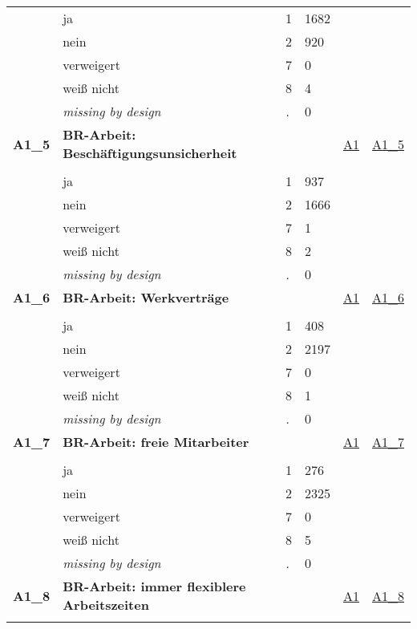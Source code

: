 \begin{longtable}{| L{2.45cm} | L{6cm} | C{1.5cm} | R{1cm} | C{2.25cm} | C{2.25cm} |}
   & ja & 1 & 1682 &  &  \\ 
   & nein & 2 & 920 &  &  \\ 
   & verweigert & 7 & 0 &  &  \\ 
   & weiß nicht & 8 & 4 &  &  \\ 
   & \textit{missing by design} & \textit{.} & 0 &  &  \\ 
   \midrule
\textbf{A1\_5}\label{var:A1:5} & \textbf{BR-Arbeit: Beschäftigungsunsicherheit} &  &  & \hyperref[A1]{A1} & \hyperref[var:suf:A1:5]{A1\_5} \\ 
   &  &  &  &  &  \\ 
   & ja & 1 & 937 &  &  \\ 
   & nein & 2 & 1666 &  &  \\ 
   & verweigert & 7 & 1 &  &  \\ 
   & weiß nicht & 8 & 2 &  &  \\ 
   & \textit{missing by design} & \textit{.} & 0 &  &  \\ 
   \midrule
\textbf{A1\_6}\label{var:A1:6} & \textbf{BR-Arbeit: Werkverträge} &  &  & \hyperref[A1]{A1} & \hyperref[var:suf:A1:6]{A1\_6} \\ 
   &  &  &  &  &  \\ 
   & ja & 1 & 408 &  &  \\ 
   & nein & 2 & 2197 &  &  \\ 
   & verweigert & 7 & 0 &  &  \\ 
   & weiß nicht & 8 & 1 &  &  \\ 
   & \textit{missing by design} & \textit{.} & 0 &  &  \\ 
   \midrule
\textbf{A1\_7}\label{var:A1:7} & \textbf{BR-Arbeit: freie Mitarbeiter} &  &  & \hyperref[A1]{A1} & \hyperref[var:suf:A1:7]{A1\_7} \\ 
   &  &  &  &  &  \\ 
   & ja & 1 & 276 &  &  \\ 
   & nein & 2 & 2325 &  &  \\ 
   & verweigert & 7 & 0 &  &  \\ 
   & weiß nicht & 8 & 5 &  &  \\ 
   & \textit{missing by design} & \textit{.} & 0 &  &  \\ 
   \midrule
\textbf{A1\_8}\label{var:A1:8} & \textbf{BR-Arbeit: immer flexiblere Arbeitszeiten} &  &  & \hyperref[A1]{A1} & \hyperref[var:suf:A1:8]{A1\_8} \\ 
   &  &  &  &  &  \\ 

\end{longtable}
